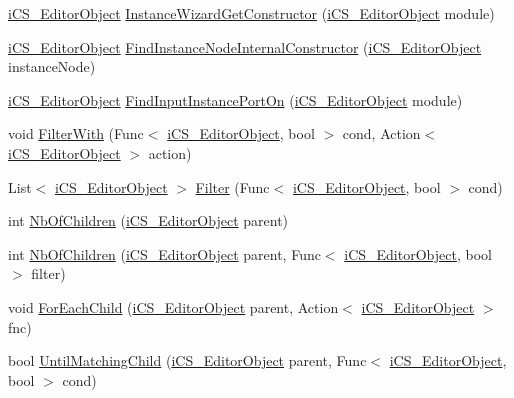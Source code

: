 \begin{DoxyCompactItemize}
\hyperlink{classi_c_s___editor_object}{i\+C\+S\+\_\+\+Editor\+Object} \hyperlink{classi_c_s___i_storage_a349307059a41fbafcaa04bcbbdd26032}{Instance\+Wizard\+Get\+Constructor} (\hyperlink{classi_c_s___editor_object}{i\+C\+S\+\_\+\+Editor\+Object} module)
\item 
\hyperlink{classi_c_s___editor_object}{i\+C\+S\+\_\+\+Editor\+Object} \hyperlink{classi_c_s___i_storage_a75a11f2db6de331ad27f3030bc8ca913}{Find\+Instance\+Node\+Internal\+Constructor} (\hyperlink{classi_c_s___editor_object}{i\+C\+S\+\_\+\+Editor\+Object} instance\+Node)
\item 
\hyperlink{classi_c_s___editor_object}{i\+C\+S\+\_\+\+Editor\+Object} \hyperlink{classi_c_s___i_storage_a35922dea60a8235f8c7719a4edd8c81a}{Find\+Input\+Instance\+Port\+On} (\hyperlink{classi_c_s___editor_object}{i\+C\+S\+\_\+\+Editor\+Object} module)
\item 
void \hyperlink{classi_c_s___i_storage_a479a6112f90dc841afe81b70f9b3a15a}{Filter\+With} (Func$<$ \hyperlink{classi_c_s___editor_object}{i\+C\+S\+\_\+\+Editor\+Object}, bool $>$ cond, Action$<$ \hyperlink{classi_c_s___editor_object}{i\+C\+S\+\_\+\+Editor\+Object} $>$ action)
\item 
List$<$ \hyperlink{classi_c_s___editor_object}{i\+C\+S\+\_\+\+Editor\+Object} $>$ \hyperlink{classi_c_s___i_storage_a2b9509f091378dcde4826d4a8ab0c639}{Filter} (Func$<$ \hyperlink{classi_c_s___editor_object}{i\+C\+S\+\_\+\+Editor\+Object}, bool $>$ cond)
\item 
int \hyperlink{classi_c_s___i_storage_a6109a58f3c0bb58849515637e20a84db}{Nb\+Of\+Children} (\hyperlink{classi_c_s___editor_object}{i\+C\+S\+\_\+\+Editor\+Object} parent)
\item 
int \hyperlink{classi_c_s___i_storage_a92e765aa1c063ba6f1abe57310facc38}{Nb\+Of\+Children} (\hyperlink{classi_c_s___editor_object}{i\+C\+S\+\_\+\+Editor\+Object} parent, Func$<$ \hyperlink{classi_c_s___editor_object}{i\+C\+S\+\_\+\+Editor\+Object}, bool $>$ filter)
\item 
void \hyperlink{classi_c_s___i_storage_a66c50ca265cc826b2443bbe407163e9b}{For\+Each\+Child} (\hyperlink{classi_c_s___editor_object}{i\+C\+S\+\_\+\+Editor\+Object} parent, Action$<$ \hyperlink{classi_c_s___editor_object}{i\+C\+S\+\_\+\+Editor\+Object} $>$ fnc)
\item 
bool \hyperlink{classi_c_s___i_storage_af5370036498af25d7f6b48e0efa5084d}{Until\+Matching\+Child} (\hyperlink{classi_c_s___editor_object}{i\+C\+S\+\_\+\+Editor\+Object} parent, Func$<$ \hyperlink{classi_c_s___editor_object}{i\+C\+S\+\_\+\+Editor\+Object}, bool $>$ cond)

\end{DoxyCompactItemize}
